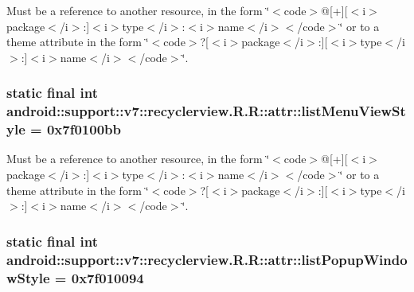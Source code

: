 Must be a reference to another resource, in the form \char`\"{}$<$code$>$@\mbox{[}+\mbox{]}\mbox{[}$<$i$>$package$<$/i$>$:\mbox{]}$<$i$>$type$<$/i$>$:$<$i$>$name$<$/i$>$$<$/code$>$\char`\"{} or to a theme attribute in the form \char`\"{}$<$code$>$?\mbox{[}$<$i$>$package$<$/i$>$:\mbox{]}\mbox{[}$<$i$>$type$<$/i$>$:\mbox{]}$<$i$>$name$<$/i$>$$<$/code$>$\char`\"{}. \hypertarget{classandroid_1_1support_1_1v7_1_1recyclerview_1_1_r_1_1attr_c8c45be455184352440f0d68a3c610fd}{
\subsubsection[{listMenuViewStyle}]{\setlength{\rightskip}{0pt plus 5cm}static final int android::support::v7::recyclerview.R.R::attr::listMenuViewStyle = 0x7f0100bb}}
\label{classandroid_1_1support_1_1v7_1_1recyclerview_1_1_r_1_1attr_c8c45be455184352440f0d68a3c610fd}


Must be a reference to another resource, in the form \char`\"{}$<$code$>$@\mbox{[}+\mbox{]}\mbox{[}$<$i$>$package$<$/i$>$:\mbox{]}$<$i$>$type$<$/i$>$:$<$i$>$name$<$/i$>$$<$/code$>$\char`\"{} or to a theme attribute in the form \char`\"{}$<$code$>$?\mbox{[}$<$i$>$package$<$/i$>$:\mbox{]}\mbox{[}$<$i$>$type$<$/i$>$:\mbox{]}$<$i$>$name$<$/i$>$$<$/code$>$\char`\"{}. \hypertarget{classandroid_1_1support_1_1v7_1_1recyclerview_1_1_r_1_1attr_5b70ae5d0e20df7bcbdf813c16c1063a}{
\subsubsection[{listPopupWindowStyle}]{\setlength{\rightskip}{0pt plus 5cm}static final int android::support::v7::recyclerview.R.R::attr::listPopupWindowStyle = 0x7f010094}}
\label{classandroid_1_1support_1_1v7_1_1recyclerview_1_1_r_1_1attr_5b70ae5d0e20df7bcbdf813c16c1063a}


